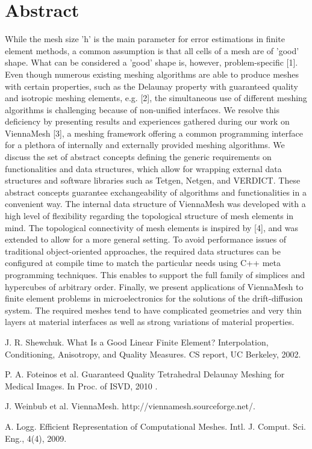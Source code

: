 \documentclass[article,A4,11pt]{llncs}%
\begin{document}
\section*{Abstract}
While the mesh size 'h' is the main parameter for error estimations in finite element methods, a common assumption is that all cells of a mesh are of 'good' shape. What can be considered a 'good' shape is, however, problem-specific [1]. Even though numerous existing meshing algorithms are able to produce meshes with certain properties, such as the Delaunay property with guaranteed quality and isotropic meshing elements, e.g. [2], the simultaneous use of different meshing algorithms is challenging because of non-unified interfaces. We resolve this deficiency by presenting results and experiences gathered during our work on ViennaMesh [3], a meshing framework offering a common programming interface for a plethora of internally and externally provided meshing algorithms. We discuss the set of abstract concepts defining the generic requirements on functionalities and data structures, which allow for wrapping external data structures and software libraries such as Tetgen, Netgen, and VERDICT. These abstract concepts guarantee exchangeability of algorithms and functionalities in a convenient way. The internal data structure of ViennaMesh was developed with a high level of flexibility regarding the topological structure of mesh elements in mind. The topological connectivity of mesh elements is inspired by [4], and was extended to allow for a more general setting. To avoid performance issues of traditional object-oriented approaches, the required data structures can be configured at compile time to match the particular needs using C++ meta programming techniques. This enables to support the full family of simplices and hypercubes of arbitrary order. Finally, we present applications of ViennaMesh to finite element problems in microelectronics for the solutions of the drift-diffusion system. The required meshes tend to have complicated geometries and very thin layers at material interfaces as well as strong variations of material properties.


\begin{thebibliography}{10}
{\sc J. R. Shewchuk}. {What Is a Good Linear Finite Element? Interpolation, Conditioning, Anisotropy, and Quality Measures}. CS report, UC Berkeley, 2002.

{\sc P. A. Foteinos et al}. {Guaranteed Quality Tetrahedral Delaunay Meshing for Medical Images}. In Proc. of ISVD, 2010 .

{\sc J. Weinbub et al}. {ViennaMesh}. http://viennamesh.sourceforge.net/.

{\sc A. Logg}. {Efficient Representation of Computational Meshes}. Intl. J. Comput. Sci. Eng., 4(4), 2009.
\end{thebibliography}
\end{document}
